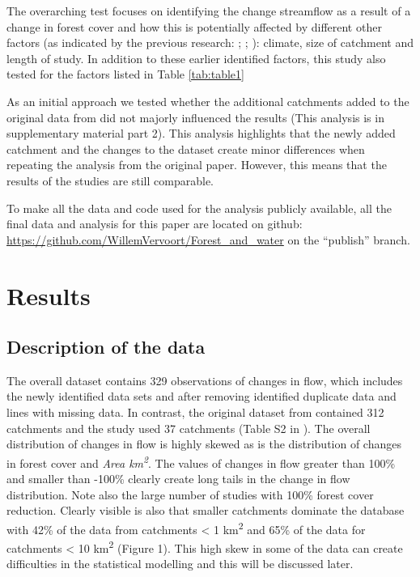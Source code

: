 \documentclass[]{elsarticle} %
\begin{document}
The overarching test focuses on identifying the change streamflow as a result of a change in forest cover and how this is potentially affected by different other factors (as indicated by the previous research: \citet{zhang2017}; \citet{filoso2017}; \citet{zhou2015}): climate, size of catchment and length of study. In addition to these earlier identified factors, this study also tested for the factors listed in Table \ref{tab:table1}

As an initial approach we tested whether the additional catchments added to the original data from \citet{zhang2017} did not majorly influenced the results (This analysis is in supplementary material part 2). This analysis highlights that the newly added catchment and the changes to the dataset create minor differences when repeating the analysis from the original paper. However, this means that the results of the studies are still comparable.

To make all the data and code used for the analysis publicly available, all the final data and analysis for this paper are located on github:\\
\href{https://github.com/WillemVervoort/Forest_and_water/tree/publish}{https://github.com/WillemVervoort/Forest\_and\_water} on the ``publish'' branch.

\hypertarget{results}{%
\section{Results}\label{results}}

\hypertarget{description-of-the-data}{%
\subsection{Description of the data}\label{description-of-the-data}}

The overall dataset contains 329 observations of changes in flow, which includes the newly identified data sets and after removing identified duplicate data and lines with missing data. In contrast, the original dataset from \citet{zhang2017} contained 312 catchments and the \citet{filoso2017} study used 37 catchments (Table S2 in \citet{filoso2017}). The overall distribution of changes in flow is highly skewed as is the distribution of changes in forest cover and \emph{Area km\textsuperscript{2}}. The values of changes in flow greater than 100\% and smaller than -100\% clearly create long tails in the change in flow distribution. Note also the large number of studies with 100\% forest cover reduction. Clearly visible is also that smaller catchments dominate the database with 42\% of the data from catchments \textless{} 1 km\textsuperscript{2} and 65\% of the data for catchments \textless{} 10 km\textsuperscript{2} (Figure 1). This high skew in some of the data can create difficulties in the statistical modelling and this will be discussed later.
\end{document}
